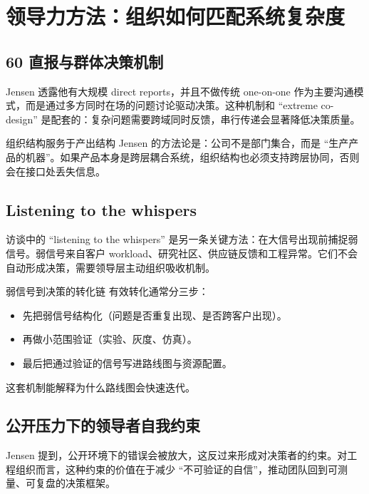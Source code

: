 \section{领导力方法：组织如何匹配系统复杂度}

\subsection{60 直报与群体决策机制}

Jensen 透露他有大规模 direct reports，并且不做传统 one-on-one 作为主要沟通模式，而是通过多方同时在场的问题讨论驱动决策。这种机制和 ``extreme co-design'' 是配套的：复杂问题需要跨域同时反馈，串行传递会显著降低决策质量。

\begin{importantbox}{组织结构服务于产出结构}
Jensen 的方法论是：公司不是部门集合，而是 ``生产产品的机器''。如果产品本身是跨层耦合系统，组织结构也必须支持跨层协同，否则会在接口处丢失信息。
\end{importantbox}

\subsection{Listening to the whispers}

访谈中的 ``listening to the whispers'' 是另一条关键方法：在大信号出现前捕捉弱信号。弱信号来自客户 workload、研究社区、供应链反馈和工程异常。它们不会自动形成决策，需要领导层主动组织吸收机制。

\begin{knowledgebox}{弱信号到决策的转化链}
有效转化通常分三步：
\begin{itemize}
    \item 先把弱信号结构化（问题是否重复出现、是否跨客户出现）。
    \item 再做小范围验证（实验、灰度、仿真）。
    \item 最后把通过验证的信号写进路线图与资源配置。
\end{itemize}
这套机制能解释为什么路线图会快速迭代。
\end{knowledgebox}

\subsection{公开压力下的领导者自我约束}

Jensen 提到，公开环境下的错误会被放大，这反过来形成对决策者的约束。对工程组织而言，这种约束的价值在于减少 ``不可验证的自信''，推动团队回到可测量、可复盘的决策框架。

